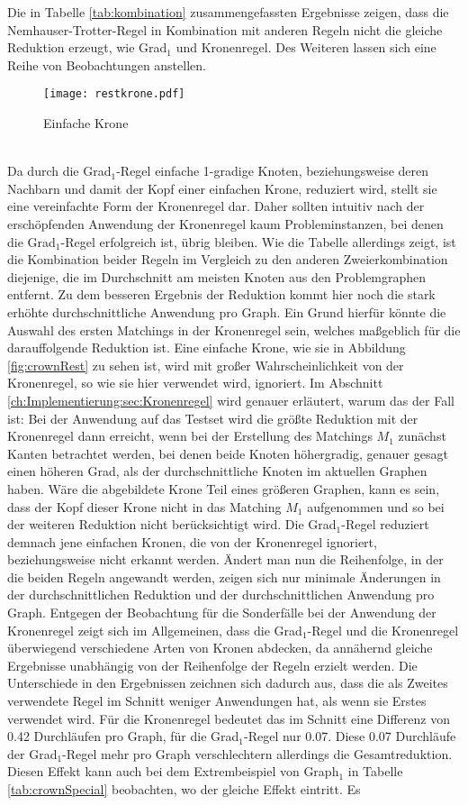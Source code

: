 Die in Tabelle \ref{tab:kombination} zusammengefassten Ergebnisse zeigen, dass die Nemhauser-Trotter-Regel in Kombination mit anderen Regeln nicht die gleiche Reduktion erzeugt, wie Grad$_{1}$ und Kronenregel. Des Weiteren lassen sich eine Reihe von Beobachtungen anstellen.
\begin{figure}[htb]
\centering
  	{\texttt{[image: restkrone.pdf]}}
	\caption{Einfache Krone\label{fig:restcrown}}
\centering
\end{figure}
\\
Da durch die Grad$_{1}$-Regel einfache 1-gradige Knoten, beziehungsweise deren Nachbarn und damit der Kopf einer einfachen Krone, reduziert wird, stellt sie eine vereinfachte Form der Kronenregel dar. Daher sollten intuitiv nach der erschöpfenden Anwendung der Kronenregel kaum Probleminstanzen, bei denen die Grad$_{1}$-Regel erfolgreich ist, übrig bleiben. Wie die Tabelle allerdings zeigt, ist die Kombination beider Regeln im Vergleich zu den anderen Zweierkombination diejenige, die im Durchschnitt am meisten Knoten aus den Problemgraphen entfernt. Zu dem besseren Ergebnis der Reduktion kommt hier noch die stark erhöhte durchschnittliche Anwendung pro Graph. Ein Grund hierfür könnte die Auswahl des ersten Matchings in der Kronenregel sein, welches maßgeblich für die darauffolgende Reduktion ist. Eine einfache Krone, wie sie in Abbildung \ref{fig:crownRest} zu sehen ist, wird mit großer Wahrscheinlichkeit von der Kronenregel, so wie sie hier verwendet wird, ignoriert. Im Abschnitt \ref{ch:Implementierung:sec:Kronenregel} wird genauer erläutert, warum das der Fall ist: Bei der Anwendung auf das Testset wird die größte Reduktion mit der Kronenregel dann erreicht, wenn bei der Erstellung des Matchings $M_{1}$ zunächst Kanten betrachtet werden, bei denen beide Knoten höhergradig, genauer gesagt einen höheren Grad, als der durchschnittliche Knoten im aktuellen Graphen haben. Wäre die abgebildete Krone Teil eines größeren Graphen, kann es sein, dass der Kopf dieser Krone nicht in das Matching $M_{1}$ aufgenommen und so bei der weiteren Reduktion nicht berücksichtigt wird. Die Grad$_{1}$-Regel reduziert demnach jene einfachen Kronen, die von der Kronenregel ignoriert, beziehungsweise nicht erkannt werden. Ändert man nun die Reihenfolge, in der die beiden Regeln angewandt werden, zeigen sich nur minimale Änderungen in der durchschnittlichen Reduktion und der durchschnittlichen Anwendung pro Graph. Entgegen der Beobachtung für die Sonderfälle bei der Anwendung der Kronenregel zeigt sich im Allgemeinen, dass die Grad$_{1}$-Regel und die Kronenregel überwiegend verschiedene Arten von Kronen abdecken, da annähernd gleiche Ergebnisse unabhängig von der Reihenfolge der Regeln erzielt werden. Die Unterschiede in den Ergebnissen zeichnen sich dadurch aus, dass die als Zweites verwendete Regel im Schnitt weniger Anwendungen hat, als wenn sie Erstes verwendet wird. Für die Kronenregel bedeutet das im Schnitt eine Differenz von 0.42 Durchläufen pro Graph, für die Grad$_{1}$-Regel nur 0.07. Diese 0.07 Durchläufe der Grad$_{1}$-Regel mehr pro Graph verschlechtern allerdings die Gesamtreduktion. Diesen Effekt kann auch bei dem Extrembeispiel von Graph${_1}$ in Tabelle \ref{tab:crownSpecial} beobachten, wo der gleiche Effekt eintritt. Es 